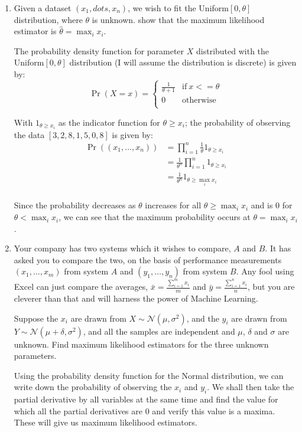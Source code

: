 \documentclass[10pt,\jkfside,a4paper]{article}
\begin{document}
\begin{enumerate}
\begin{enumerate}
\end{enumerate}

\item Given a dataset $(x_1, dots, x_n)$, we wish to fit the Uniform$[0,
\theta]$ distribution, where $\theta$ is unknown. show that the maximum
likelihood estimator is $\hat{\theta} = \max_i x_i$.

The probability density function for parameter $X$ distributed with the
Uniform$[0, \theta]$ distribution (I will assume the distribution is discrete)
is given by:
\[
\Pr(X = x) =
\begin{cases}
\frac{1}{\theta + 1} & \text{if} \ x <= \theta \\
0 & \text{otherwise} \\
\end{cases}
\]

With $1_{\theta \geq x_i}$ as the indicator function for $\theta \geq x_i$;
the probability of observing the data $[3, 2, 8, 1, 5, 0, 8]$ is given by:
\[
\begin{split}
\Pr((x_1, \dots, x_n)) &= \prod^n_{i=1} \frac{1}{\theta} 1_{\theta \geq x_i} \\
&= \frac{1}{\theta^n} \prod^n_{i=1} 1_{\theta \geq x_i} \\
&= \frac{1}{\theta^n} 1_{\theta \geq \max_i x_i} \\
\end{split}
\]

Since the probability decreases as $\theta$ increases for all $\theta \geq
\max_i x_i$ and is 0 for $\theta < \max_i x_i$, we can see that the maximum
probability occurs at $\theta = \max_i x_i$.

\item Your company has two systems which it wishes to compare, $A$ and $B$.
It has asked you to compare the two, on the basis of performance
measurements $(x_1, \dots, x_m)$ from system $A$ and $(y_1, \dots, y_n)$
from system $B$. Any fool using Excel can just compare the averages,
$\bar{x} = \frac{\sum^m_{i=1}x_i}{m}$ and $\bar{y} =
\frac{\sum^n_{i=1}x_i}{n}$, but you are cleverer than that and will harness
the power of Machine Learning.

Suppose the $x_i$ are drawn from $X \sim \mathcal{N}(\mu, \sigma^2)$, and the
$y_i$ are drawn from $Y \sim \mathcal{N}(\mu + \delta, \sigma^2)$, and all
the samples are independent and $\mu$, $\delta$ and $\sigma$ are unknown.
Find maximum likelihood estimators for the three unknown parameters.

Using the probability density function for the Normal distribution, we can
write down the probability of observing the $x_i$ and $y_i$. We shall then
take the partial derivative by all variables at the same time and find the
value for which all the partial derivatives are 0 and verify this value is a
maxima. These will give us maximum likelihood estimators.


\end{enumerate}
\end{document}
